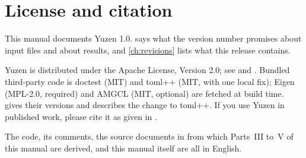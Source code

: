 \section{License and citation}
\label{sec:intro:license}

This manual documents Yuzen 1.0.  says what the version number
promises about input files and about results, and \cref{ch:revisions} lists
what this release contains.

Yuzen is distributed under the Apache License, Version 2.0; see 
and . Bundled third-party code is doctest (MIT) and toml++ (MIT,
with one local fix); Eigen (MPL-2.0, required) and AMGCL (MIT, optional) are
fetched at build time.  gives their versions
and describes the change to toml++. If you use Yuzen in published work, please
cite it as given in .

The code, its comments, the source documents in  from which
Parts~III to~V of this manual are derived, and this manual itself are all in
English.
